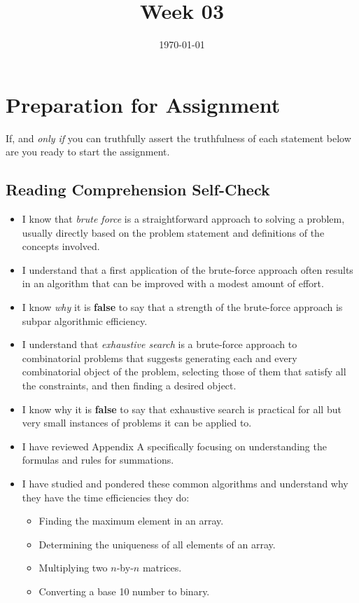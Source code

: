 \documentclass[12pt]{amsart}
\title{Week 03}
\date{\today}
\begin{document}
\maketitle

\section{Preparation for Assignment}
If, and \textit{only if} you can truthfully assert the truthfulness of each statement below are you ready to start the assignment.
\subsection {Reading Comprehension Self-Check}
\begin{itemize}
  \item I know that \textit{brute force} is a straightforward approach to solving a problem, usually directly based on the problem statement and definitions of the concepts involved.
  \item I understand that a first application of the brute-force approach often
    results in an algorithm that can be improved with a modest amount of effort.
  \item I know \textit{why} it is \textbf{false} to say that a strength of the brute-force
    approach is subpar algorithmic efficiency.
  \item I understand that \textit{exhaustive search} is a brute-force approach to combinatorial problems that suggests generating each and every combinatorial object of the problem, selecting those of them that satisfy all the constraints, and then finding a desired object.
  \item I know why it is \textbf{false} to say that exhaustive search is practical for all but very small instances of problems it can be applied to.
  \item I have reviewed Appendix A specifically focusing on understanding the formulas and rules for summations.
  \item I have studied and pondered these common algorithms and understand why they have the time efficiencies they do:
  \begin{itemize}
    \item Finding the maximum element in an array.
    \item Determining the uniqueness of all elements of an array.
     \item Multiplying two $n$-by-$n$ matrices.
     \item Converting a base 10 number to binary.
  \end{itemize}
\end{itemize}
\end{document}
